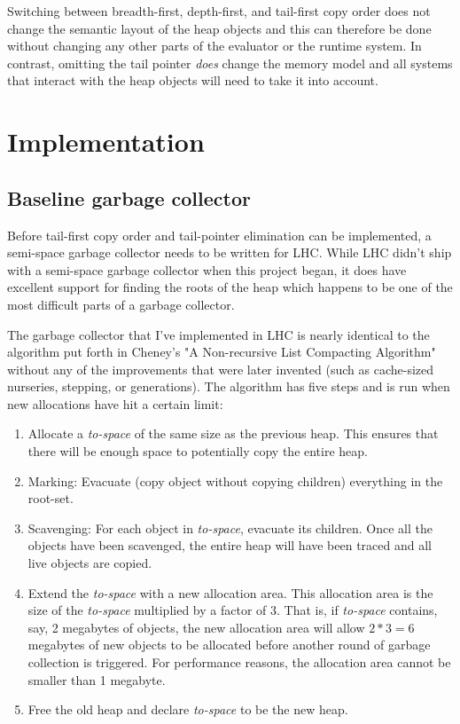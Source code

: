 \documentclass[a4paper,oneside]{memoir}
\begin{document}
Switching between breadth-first, depth-first, and tail-first copy order does not
change the semantic layout of the heap objects and this can therefore be done
without changing any other parts of the evaluator or the runtime system. In
contrast, omitting the tail pointer \emph{does} change the memory model and
all systems that interact with the heap objects will need to take it into
account.

\section{Implementation}

\subsection{Baseline garbage collector}\label{algorithm}

Before tail-first copy order and tail-pointer elimination can be implemented,
a semi-space garbage collector needs to be written for LHC. While LHC didn't
ship with a semi-space garbage collector when this project began, it does have
excellent support for finding the roots of the heap which happens to be one of
the most difficult parts of a garbage collector.

The garbage collector that I've implemented in LHC is nearly identical to the
algorithm put forth in Cheney's "A Non-recursive List Compacting Algorithm"
without any of the improvements that were later invented (such as cache-sized
nurseries, stepping, or generations). The algorithm has five steps and is run
when new allocations have hit a certain limit:
\begin{enumerate}
  \item Allocate a \emph{to-space} of the same size as the previous heap. This
  ensures that there will be enough space to potentially copy the entire heap.
  \item Marking: Evacuate (copy object without copying children) everything in the root-set.
  \item Scavenging: For each object in \emph{to-space}, evacuate its children. Once all
  the objects have been scavenged, the entire heap will have been traced and all
  live objects are copied.
  \item Extend the \emph{to-space} with a new allocation area. This allocation
  area is the size of the \emph{to-space} multiplied by a factor of 3. That is,
  if \emph{to-space} contains, say, 2 megabytes of objects, the new allocation
  area will allow $2*3=6$ megabytes of new objects to be allocated before another
  round of garbage collection is triggered. For performance reasons, the allocation
  area cannot be smaller than 1 megabyte.
  \item Free the old heap and declare \emph{to-space} to be the new heap.
\end{enumerate}
\end{document}
